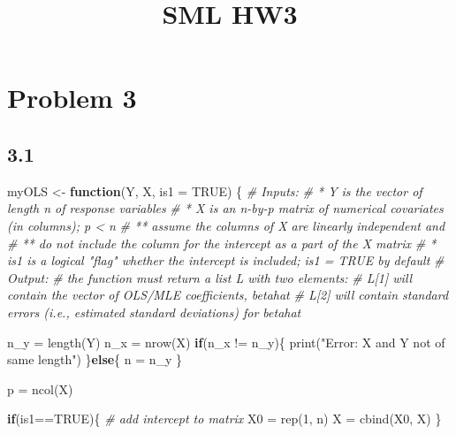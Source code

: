 \documentclass[
  11pt,
]{article}
\title{SML HW3}
\author{}
\date{\vspace{-2.5em}}
\newenvironment{Shaded}{\begin{snugshade}}{\end{snugshade}}
\newcommand{\AttributeTok}[1]{\textcolor[rgb]{0.77,0.63,0.00}{#1}}
\newcommand{\CommentTok}[1]{\textcolor[rgb]{0.56,0.35,0.01}{\textit{#1}}}
\newcommand{\ConstantTok}[1]{\textcolor[rgb]{0.00,0.00,0.00}{#1}}
\newcommand{\ControlFlowTok}[1]{\textcolor[rgb]{0.13,0.29,0.53}{\textbf{#1}}}
\newcommand{\DecValTok}[1]{\textcolor[rgb]{0.00,0.00,0.81}{#1}}
\newcommand{\FunctionTok}[1]{\textcolor[rgb]{0.00,0.00,0.00}{#1}}
\newcommand{\NormalTok}[1]{#1}
\newcommand{\OtherTok}[1]{\textcolor[rgb]{0.56,0.35,0.01}{#1}}
\newcommand{\SpecialCharTok}[1]{\textcolor[rgb]{0.00,0.00,0.00}{#1}}
\newcommand{\StringTok}[1]{\textcolor[rgb]{0.31,0.60,0.02}{#1}}
\begin{document}
\maketitle

\hypertarget{problem-3}{%
\section{Problem 3}\label{problem-3}}

\hypertarget{section}{%
\subsection{3.1}\label{section}}

\begin{Shaded}
\begin{Highlighting}[]
\NormalTok{myOLS }\OtherTok{\textless{}{-}} \ControlFlowTok{function}\NormalTok{(Y, X, }\AttributeTok{is1 =} \ConstantTok{TRUE}\NormalTok{) \{}
\CommentTok{\# Inputs:}
\CommentTok{\# * Y is the vector of length n of response variables}
\CommentTok{\# * X is an n{-}by{-}p matrix of numerical covariates (in columns); p \textless{} n}
\CommentTok{\# ** assume the columns of X are linearly independent and}
\CommentTok{\# ** do not include the column for the intercept as a part of the X matrix}
\CommentTok{\# * is1 is a logical "flag" whether the intercept is included; is1 = TRUE by default}
\CommentTok{\# Output:}
\CommentTok{\# the function must return a list L with two elements:}
\CommentTok{\# L[1] will contain the vector of OLS/MLE coefficients, betahat}
\CommentTok{\# L[2] will contain standard errors (i.e., estimated standard deviations) for betahat}

\NormalTok{  n\_y }\OtherTok{=} \FunctionTok{length}\NormalTok{(Y)}
\NormalTok{  n\_x }\OtherTok{=} \FunctionTok{nrow}\NormalTok{(X)}
  \ControlFlowTok{if}\NormalTok{(n\_x }\SpecialCharTok{!=}\NormalTok{ n\_y)\{}
    \FunctionTok{print}\NormalTok{(}\StringTok{"Error: X and Y not of same length"}\NormalTok{)}
\NormalTok{  \}}\ControlFlowTok{else}\NormalTok{\{}
\NormalTok{    n }\OtherTok{=}\NormalTok{ n\_y}
\NormalTok{  \}}
  
\NormalTok{  p }\OtherTok{=} \FunctionTok{ncol}\NormalTok{(X)}
  
  \ControlFlowTok{if}\NormalTok{(is1}\SpecialCharTok{==}\ConstantTok{TRUE}\NormalTok{)\{}
    \CommentTok{\# add intercept to matrix}
\NormalTok{    X0 }\OtherTok{=} \FunctionTok{rep}\NormalTok{(}\DecValTok{1}\NormalTok{, n)}
\NormalTok{    X }\OtherTok{=} \FunctionTok{cbind}\NormalTok{(X0, X)}
\NormalTok{  \}}
  

\end{Highlighting}
\end{Shaded}
\end{document}
